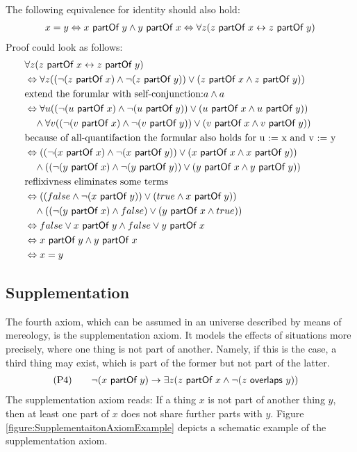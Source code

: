 \noindent
The following equivalence for identity should also hold:
\begin{align}
x = y
\Leftrightarrow
x ~\textsf{partOf}~ y \wedge y ~\textsf{partOf}~ x
\Leftrightarrow
\forall z (z ~\textsf{partOf}~ x \leftrightarrow z ~\textsf{partOf}~ y)
\end{align}
Proof could look as follows:
\begin{align*}
&\forall z (z ~\textsf{partOf}~ x \leftrightarrow z ~\textsf{partOf}~ y)
\\&\Leftrightarrow
\forall z
((\neg(z ~\textsf{partOf}~ x) \wedge \neg(z ~\textsf{partOf}~ y)) \vee (z ~\textsf{partOf}~ x \wedge z ~\textsf{partOf}~ y))
\\&\text{extend the forumlar with self-conjunction:} a \wedge a
\\&\Leftrightarrow
\forall u
((\neg(u ~\textsf{partOf}~ x) \wedge \neg(u ~\textsf{partOf}~ y)) \vee (u ~\textsf{partOf}~ x \wedge u ~\textsf{partOf}~ y))
\\&\quad\wedge
\forall v
((\neg(v ~\textsf{partOf}~ x) \wedge \neg(v ~\textsf{partOf}~ y)) \vee (v ~\textsf{partOf}~ x \wedge v ~\textsf{partOf}~ y))
\\&\text{because of all-quantifaction the formular also holds for u := x and v := y}
\\&\Leftrightarrow
((\neg(x ~\textsf{partOf}~ x) \wedge \neg(x ~\textsf{partOf}~ y)) \vee (x ~\textsf{partOf}~ x \wedge x ~\textsf{partOf}~ y))
\\&\quad\wedge
((\neg(y ~\textsf{partOf}~ x) \wedge \neg(y ~\textsf{partOf}~ y)) \vee (y ~\textsf{partOf}~ x \wedge y ~\textsf{partOf}~ y))
\\&\text{reflixivness eliminates some terms}
\\&\Leftrightarrow
((false \wedge \neg(x ~\textsf{partOf}~ y)) \vee (true \wedge x ~\textsf{partOf}~ y))
\\&\quad\wedge
((\neg(y ~\textsf{partOf}~ x) \wedge false) \vee (y ~\textsf{partOf}~ x \wedge true))
\\&\Leftrightarrow
false \vee x ~\textsf{partOf}~ y \wedge false \vee y ~\textsf{partOf}~ x
\\&\Leftrightarrow
x ~\textsf{partOf}~ y \wedge y ~\textsf{partOf}~ x
\\&\Leftrightarrow
x = y
\end{align*}

\subsection{Supplementation}
\label{subsection:Supplementation}
The fourth axiom, which can be assumed in an universe described by means of mereology, is the supplementation axiom.
It models the effects of situations more precisely, where one thing is not part of another.
Namely, if this is the case, a third thing may exist, which is part of the former but not part of the latter.
\begin{align}
&\text{(P4)}
\qquad
\neg(x ~\textsf{partOf}~ y) \rightarrow \exists z (z ~\textsf{partOf}~ x \wedge \neg(z ~\textsf{overlaps}~ y))
\end{align}
The supplementation axiom reads:
If a thing $x$ is not part of another thing $y$, then at least one part of $x$ does not share further parts with $y$.
Figure \ref{figure:SupplementaitonAxiomExample} depicts a schematic example of the supplementation axiom.

